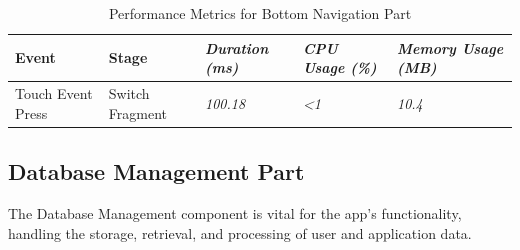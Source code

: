 \documentclass[conference,10pt,letterpaper]{IEEEtran}
\begin{document}
	\begin{table}[b]
		\centering
		\begin{tabularx}{6.2in}{|X|X|X|X|X|}
			\hline
			\textbf{Event} & \textbf{Stage} & \textbf{\textit{Duration (ms)}} & \textbf{\textit{CPU Usage (\%)}} & \textbf{\textit{Memory Usage (MB)}} \\ \hline
			Touch Event Press & Switch Fragment  & \textit{100.18}  & \textit{\textless 1}            & \textit{10.4} \\ \hline
		\end{tabularx}
		\caption{Performance Metrics for Bottom Navigation Part}
		\label{tab:nav_performance}
	\end{table}
	
	\subsection{Database Management Part}
	
	The Database Management component is vital for the app's functionality, handling the storage, retrieval, and processing of user and application data.
	
\end{document}
